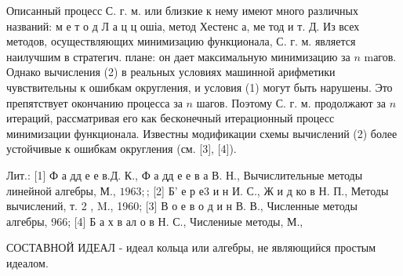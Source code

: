 \documentclass[10pt]{article}
\begin{document}
Описанный процесс С. г. м. или близкие к нему имеют много различных названий: м е т о д Л а ц ц ошіа, метод Хестенс а, ме тод и т. Д. Из всех методов, осуществляющих минимизацию функционала, С. г. м. является наилучшим в стратегич. плане: он дает максимальную минимизацию за $n$ mагов. Однако вычисления (2) в реальных условиях машинной арифметики чувствительны к ошибкам округления, и условия (1) могут быть нарушены. Это препятствует окончанию процесса за $n$ шагов. Поэтому С. г. м. продолжают за $n$ итераций, рассматривая его как бесконечный итерационный процесс минимизации функционала. Известны модификации схемы вычислений (2) более устойчивые к ошибкам округления (см. [3], [4]).



Лит.: [1] Ф а дд е е в.Д. К., Ф а дд е е в а В. Н., Вычислительные методы линейной алгебры, М., $1963 ;$; [2] Б' е р е3 и н И. С., Ж и д ко в Н. П., Методы вычислений, т. 2 , M., 1960; [3] В о е в о д и н В. В., Численные методы алгебры, 966; [4] Б а х в ал о в Н. С., Числениые методы, М.,



СОСТАВНОЙ ИДЕАЛ - идеал кольца или алгебры, не являющиӥся простым идеалом.
\end{document}
